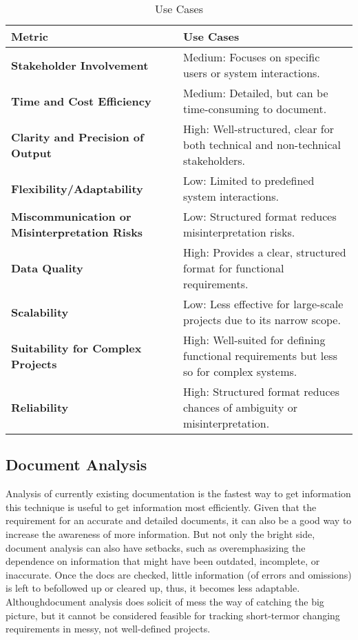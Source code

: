 \documentclass[conference]{IEEEtran}
\begin{document}
\begin{table}[htbp]
\caption{Use Cases}
\label{tab4}
\centering
\begin{tabular}{|p{4cm}|p{4cm}|}
\hline
\textbf{Metric}                     & \textbf{Use Cases}                                            \\ \hline
\textbf{Stakeholder Involvement}     & Medium: Focuses on specific users or system interactions.     \\ \hline
\textbf{Time and Cost Efficiency}    & Medium: Detailed, but can be time-consuming to document.      \\ \hline
\textbf{Clarity and Precision of Output} & High: Well-structured, clear for both technical and non-technical stakeholders. \\ \hline
\textbf{Flexibility/Adaptability}    & Low: Limited to predefined system interactions.              \\ \hline
\textbf{Miscommunication or Misinterpretation Risks} & Low: Structured format reduces misinterpretation risks.      \\ \hline
\textbf{Data Quality}                    & High: Provides a clear, structured format for functional requirements. \\ \hline
\textbf{Scalability}                     & Low: Less effective for large-scale projects due to its narrow scope. \\ \hline
\textbf{Suitability for Complex Projects} & High: Well-suited for defining functional requirements but less so for complex systems. \\ \hline
\textbf{Reliability}                     & High: Structured format reduces chances of ambiguity or misinterpretation. \\ \hline
\end{tabular}
\end{table}

\subsection*{Document Analysis}
Analysis of currently existing documentation is the fastest way to get information this technique is useful to get information most efficiently. Given that the requirement for an accurate and detailed documents, it can also be a good way to increase the awareness of more information. But not only the bright side, document analysis can also have setbacks, such as overemphasizing the dependence on information that might have been outdated, incomplete, or inaccurate. Once  the  docs  are  checked,  little  information  (of  errors  and  omissions)  is  left  to  befollowed up or cleared up, thus, it becomes less adaptable. Althoughdocument  analysis  does  solicit  of  mess  the  way  of  catching  the  big  picture, but it cannot be considered feasible for tracking short-termor changing requirements in messy, not well-defined projects.
\end{document}

